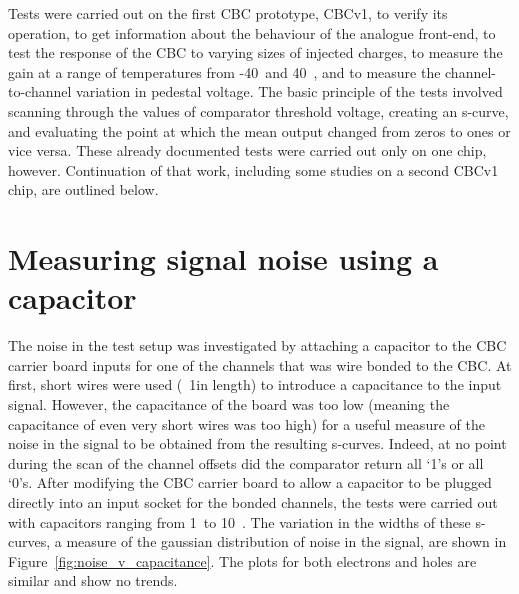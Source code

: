 Tests were carried out on the first CBC prototype, CBCv1, to verify its operation, to get information about
the behaviour of the analogue front-end, to test the response of the CBC to varying sizes of injected charges,
to measure the gain at a range of temperatures from -40~\degreeCelsius and 40~\degreeCelsius, and to measure
the channel-to-channel variation in pedestal voltage. The basic principle of the tests involved scanning
through the values of comparator threshold voltage, creating an s-curve, and evaluating the point at which
the mean output changed from zeros to ones or vice versa. These already documented tests were carried out only
on one chip, however. Continuation of that work, including some studies on a second CBCv1 chip, are outlined
below.

\section{Measuring signal noise using a capacitor}
\label{s:measuring_signal_noise_using_a_capacitor}

The noise in the test setup was investigated by attaching a capacitor to the CBC carrier board inputs for one
of the channels that was wire bonded to the CBC. At first, short wires were used (~1\cm in length) to
introduce a capacitance to the input signal. However, the capacitance of the board was too low (meaning the
capacitance of even very short wires was too high) for a useful measure of the noise in the signal to be
obtained from the resulting s-curves. Indeed, at no point during the scan of the channel offsets did the
comparator return all `1's or all `0's. After modifying the CBC carrier board to allow a capacitor to be
plugged directly into an input socket for the bonded channels, the tests were carried out with capacitors
ranging from 1~\pF to 10~\pF. The variation in the widths of these s-curves, a measure of the gaussian
distribution of noise in the signal, are shown in Figure~\ref{fig:noise_v_capacitance}. The plots for both
electrons and holes are similar and show no trends.

